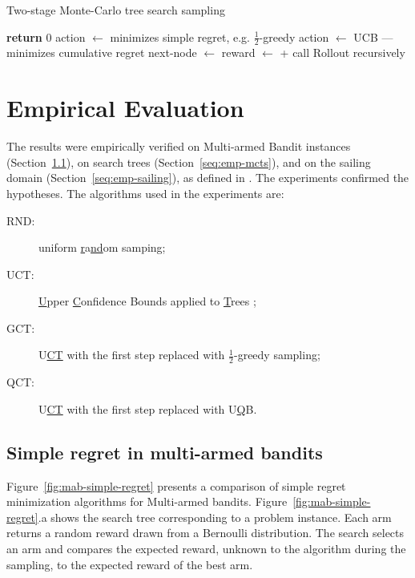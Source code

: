 \documentclass{article}
\begin{document}
\begin{algorithm}[t]
\caption{Two-stage Monte-Carlo tree search sampling}
\label{alg:two-stage-mcts}
\begin{algorithmic}[1]
    \State \textbf{return} 0
  \Else
      \State action $\gets$  \Comment minimizes simple regret, e.g. $\frac 1 2$-greedy
    \Else
      \State action $\gets$  \Comment  UCB --- minimizes cumulative regret
    \EndIf
    \State next-node $\gets$ 
    \State reward $\gets$ 
    \State \hspace{4em} +  \Comment call {\sc Rollout} recursively
    \State {}
  \EndIf
\EndProcedure
\end{algorithmic}
\end{algorithm}

\section{Empirical Evaluation}

The results were empirically verified on Multi-armed Bandit instances
(Section~\ref{seq:emp-mab}), on search trees
(Section~\ref{seq:emp-mcts}), and on the sailing domain
(Section~\ref{seq:emp-sailing}), as defined in \cite{Kocsis.uct}. The
experiments confirmed the hypotheses. The algorithms used in the
experiments are:
\begin{description}
\item[RND:] uniform \underline{r}a\underline{nd}om samping;
\item[UCT:] \underline{U}pper \underline{C}onfidence Bounds applied to
  \underline{T}rees \cite{Kocsis.uct};
\item[GCT:] U\underline{CT} with the first step
  replaced with $\frac 1 2$-\underline{g}reedy sampling;
\item[QCT:] U\underline{CT} with the first step
  replaced with U\underline{Q}B.
\end{description}

\subsection{Simple regret in multi-armed bandits}
\label{seq:emp-mab}

Figure~\ref{fig:mab-simple-regret} presents a comparison of simple
regret minimization algorithms for Multi-armed
bandits. Figure~\ref{fig:mab-simple-regret}.a shows the search tree
corresponding to a problem instance. Each arm returns a random reward
drawn from a Bernoulli distribution. The search selects an arm
and compares the expected reward, unknown to the algorithm during the
sampling, to the expected reward of the best arm.
\end{document}
